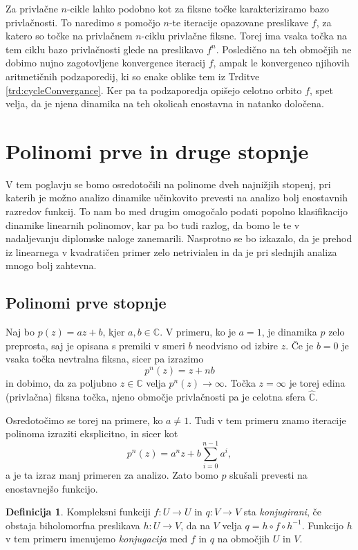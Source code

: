 \documentclass[12pt,a4paper]{amsart}
\theoremstyle{definition} %
\newtheorem{definicija}{Definicija}[section]
\theoremstyle{plain} %
\newcommand{\CC}{\mathbb C}
\newcommand{\CCinf} {\hat{\CC}} %
\begin{document}
Za privlačne $n$-cikle lahko podobno kot za fiksne točke karakteriziramo bazo privlačnosti.
To naredimo s pomočjo $n$-te iteracije opazovane preslikave $f$, za katero so točke na privlačnem $n$-ciklu privlačne fiksne.
Torej ima vsaka točka na tem ciklu bazo privlačnosti glede na preslikavo $f^n$.
Posledično na teh območjih ne dobimo nujno zagotovljene konvergence iteracij $f$, 
ampak le konvergenco njihovih aritmetičnih podzaporedij, ki so enake oblike tem iz Trditve \ref{trd:cycleConvergance}.
Ker pa ta podzaporedja opišejo celotno orbito $f$, spet velja, da je njena dinamika na teh okolicah enostavna in natanko določena.



\section{Polinomi prve in druge stopnje}
V tem poglavju se bomo osredotočili na polinome dveh najnižjih stopenj, 
pri katerih je možno analizo dinamike učinkovito prevesti na analizo bolj enostavnih razredov funkcij.
To nam bo med drugim omogočalo podati popolno klasifikacijo dinamike linearnih polinomov,
kar pa bo tudi razlog, da bomo le te v nadaljevanju diplomske naloge zanemarili.
Nasprotno se bo izkazalo, da je prehod iz linearnega v kvadratičen primer zelo netrivialen in da je pri slednjih analiza mnogo bolj zahtevna.

\subsection{Polinomi prve stopnje}
Naj bo $p(z) = az + b$, kjer $a, b \in \CC$.
V primeru, ko je $a = 1$, je dinamika $p$ zelo preprosta, saj je opisana s premiki v smeri $b$ neodvisno od izbire $z$.
Če je $b=0$ je vsaka točka nevtralna fiksna, sicer pa izrazimo
$$p^n(z)=z+nb$$
in dobimo, da za poljubno $z\in\CCinf$ velja $p^n(z)\to\infty$. 
Točka $z=\infty$ je torej edina (privlačna) fiksna točka,  njeno območje privlačnosti pa je celotna sfera $\CCinf$.

Osredotočimo se torej na primere, ko $a \neq 1$. 
Tudi v tem primeru znamo iteracije polinoma izraziti eksplicitno, in sicer kot
$$p^n(z) = a^nz + b\sum_{i = 0}^{n-1}a^i,$$  
a je ta izraz manj primeren za analizo. 
Zato bomo $p$ skušali prevesti na enostavnejšo funkcijo.

\begin{definicija}
Kompleksni funkciji $f \colon U \to U$ in $q \colon V \to V$ sta  {\em konjugirani}, 
če obstaja biholomorfna preslikava $h \colon U \to V$, 
da na $V$ velja $q = h \circ f \circ h^{-1}$. 
Funkcijo $h$ v tem primeru imenujemo {\em konjugacija} med $f$ in $q$ na območjih $U$ in $V$.
\end{definicija}
\end{document}
